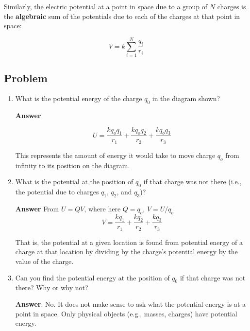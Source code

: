 \documentclass{article}
\begin{document}
Similarly, the electric potential at a point in space due to a group of $N$ charges is the {\bf algebraic} sum of the potentials due to each of the charges at that point in space:

$$
V=k \sum_{i=1}^N {\frac{q_i}{r_i}}
$$

\newpage

\subsection{Problem}



\begin{enumerate}

  \item What is the potential energy of the charge $q_0$ in the diagram shown?

        \ifsolutions
        {\bf Answer}

        $$
        U = \frac{kq_oq_1}{r_1}+\frac{kq_oq_2}{r_2}+\frac{kq_oq_3}{r_3}
        $$

        This represents the amount of energy it would take to move charge $q_o$ from infinity to its position on the 
        diagram.
        \else

        \vskip 48pt
        \fi

  \item What is the potential at the position of $q_0$ if that charge was not there (i.e., the potential due to charges $q_1$, $q_2$, and $q_3$)?

        \ifsolutions
        {\bf Answer} From $U=QV$, where here $Q=q_o$, $V=U/q_o$ 
        $$
        V = \frac{kq_1}{r_1}+\frac{kq_2}{r_2}+\frac{kq_3}{r_3}
        $$

        That is, the potential at a given location is found from potential energy of a charge at that location by dividing by the charge's potential energy by the value of the charge.
        \else

        \vskip 48pt
        \fi

  \item Can you find the potential energy at the position of $q_0$ if that charge was not there? Why or why not?

        \ifsolutions
        {\bf Answer}: No. It does not make sense to ask what the potential energy is at a point in space. Only physical objects (e.g., masses, charges) have potential energy.
        \else

        \vskip 48pt
        \fi


\end{enumerate}
\end{document}
